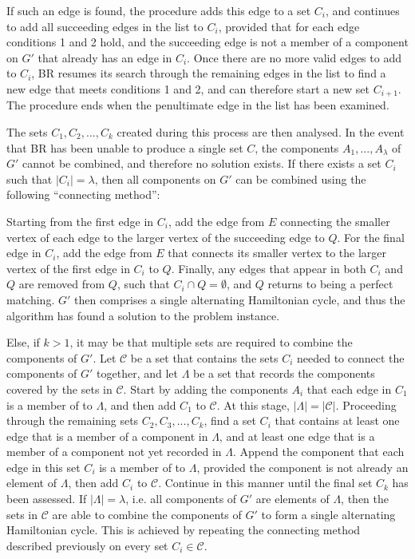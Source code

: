 \documentclass[oribibl]{llncs}
\begin{document}
If such an edge is found, the procedure adds this edge to a set $C_i$, and continues to add all succeeding edges in the list to $C_i$, provided that for each edge conditions 1 and 2 hold, and the succeeding edge is not a member of a component on $G'$ that already has an edge in $C_i$. Once there are no more valid edges to add to $C_i$, BR resumes its search through the remaining edges in the list to find a new edge that meets conditions 1 and 2, and can therefore start a new set $C_{i+1}$. The procedure ends when the penultimate edge in the list has been examined.

The sets $C_1, C_2, ..., C_k$ created during this process are then analysed. In the event that BR has been unable to produce a single set $C$, the components $A_1,..., A_{\lambda}$ of $G'$ cannot be combined, and therefore no solution exists. If there exists a set $C_i$ such that $|C_i| = \lambda$, then all components on $G'$ can be combined using the following ``connecting method'':

Starting from the first edge in $C_i$, add the edge from $E$ connecting the smaller vertex of each edge to the larger vertex of the succeeding edge to $Q$. For the final edge in $C_i$, add the edge from $E$ that connects its smaller vertex to the larger vertex of the first edge in $C_i$ to $Q$. Finally, any edges that appear in both $C_i$ and $Q$ are removed from $Q$, such that $C_i \cap Q = \emptyset$, and $Q$ returns to being a perfect matching. $G'$ then comprises a single alternating Hamiltonian cycle, and thus the algorithm has found a solution to the problem instance.


Else, if $k > 1$, it may be that multiple sets are required to combine the components of $G'$. Let $\mathcal{C}$ be a set that contains the sets $C_i$ needed to connect the components of $G'$ together, and let $\Lambda$ be a set that records the components covered by the sets in $\mathcal{C}$. Start by adding the components $A_i$ that each edge in $C_1$ is a member of to $\Lambda$, and then add $C_1$ to $\mathcal{C}$. At this stage, $|\Lambda| = |\mathcal{C}|$. Proceeding through the remaining sets $C_2, C_3, ..., C_k$, find a set $C_i$ that contains at least one edge that is a member of a component in $\Lambda$, and at least one edge that is a member of a component not yet recorded in $\Lambda$. Append the component that each edge in this set $C_i$ is a member of to $\Lambda$, provided the component is not already an element of $\Lambda$, then add $C_i$ to $\mathcal{C}$. Continue in this manner until the final set $C_k$ has been assessed. If $|\Lambda| = \lambda$, i.e. all components of $G'$ are elements of $\Lambda$, then the sets in $\mathcal{C}$ are able to combine the components of $G'$ to form a single alternating Hamiltonian cycle. This is achieved by repeating the connecting method described previously on every set $C_i \in \mathcal{C}$.
\end{document}
